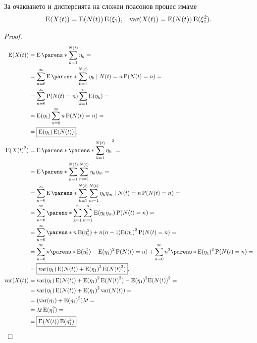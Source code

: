 \documentclass{../../common/topic}
\begin{document}
\begin{theorem}
  За очакването и дисперсията на сложен поасонов процес имаме
  \begin{align*}
    \operatorname{E}(X(t)) = \operatorname{E}(N(t)) \operatorname{E}(\xi_1),
    &&
    \operatorname{var}(X(t)) = \operatorname{E}(N(t)) \operatorname{E}(\xi_1^2).
  \end{align*}
\end{theorem}
\begin{proof}
  \begin{align*}
    \Expect(X(t))
    &=
    \Expect\parens*{ \sum_{k=1}^{N(t)} \eta_k }
    = \\ &=
    \sum_{n=0}^\infty \Expect\parens*{ \sum_{k=1}^{N(t)} \eta_k \mid N(t) = n } \Prob(N(t) = n)
    = \\ &=
    \sum_{n=0}^\infty \Prob(N(t) = n) \sum_{k=1}^n \Expect(\eta_k)
    = \\ &=
    \Expect(\eta_1) \sum_{n=0}^\infty n \Prob(N(t) = n)
    = \\ &=
    \boxed{\Expect(\eta_1) \Expect(N(t))},
    \\
    \Expect({X(t)}^2)
    &=
    \Expect\parens*{ {\parens*{\sum_{k=1}^{N(t)} \eta_k }}^2 }
    = \\ &=
    \Expect\parens*{ \sum_{k=1}^{N(t)} \sum_{m=1}^{N(t)} \eta_k \eta_m }
    = \\ &=
    \sum_{n=0}^\infty \Expect\parens*{ \sum_{k=1}^{N(t)} \sum_{m=1}^{N(t)} \eta_k \eta_m \mid N(t) = n } \Prob(N(t) = n)
    = \\ &=
    \sum_{n=0}^\infty \parens*{ \sum_{k=1}^n \sum_{m=1}^n \Expect(\eta_k \eta_m) } \Prob(N(t) = n)
    = \\ &=
    \sum_{n=0}^\infty \parens*{ n \Expect(\eta_1^2) + n (n-1) {\Expect(\eta_1)}^2 } \Prob(N(t) = n)
    = \\ &=
    \sum_{n=0}^\infty n \parens*{ \Expect(\eta_1^2) - {\Expect(\eta_1)}^2 } \Prob(N(t) = n) + \sum_{n=0}^\infty n^2 \parens*{ {\Expect(\eta_1)}^2 } \Prob(N(t) = n)
    = \\ &=
    \boxed{\var(\eta_1) \Expect(N(t)) + {\Expect(\eta_1)}^2 \Expect({N(t)}^2)},
    \\
    \var(X(t))
    &=
    \var(\eta_1) \Expect(N(t)) + {\Expect(\eta_1)}^2 \Expect({N(t)}^2) - {\Expect(\eta_1)}^2 {\Expect(N(t))}^2
    = \\ &=
    \var(\eta_1) \Expect(N(t)) + {\Expect(\eta_1)}^2 \var(N(t))
    = \\ &=
    (\var(\eta_1) + {\Expect(\eta_1)}^2) \lambda t
    = \\ &=
    \lambda t \Expect(\eta_1^2)
    = \\ &=
    \boxed{\Expect(N(t)) \Expect(\eta_1^2)}.
  \end{align*}
\end{proof}
\end{document}
